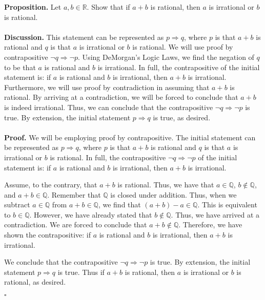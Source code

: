 \documentclass[12pt]{exam}
\begin{document}
\begin{questions}
\question
\textbf{Proposition.}  Let $a,b \in \mathbb R$.  Show that if $a+b$ is rational, then $a$ is irrational or $b$ is rational.
\\
\\\textbf{Discussion.} This statement can be represented as $p \Rightarrow q$, where $p$ is that $a+b$ is rational and $q$ is that $a$ is irrational or $b$ is rational. We will use proof by contrapositive $\neg q \Rightarrow \neg p$. Using DeMorgan's Logic Laws, we find the negation of $q$ to be that $a$ is rational and $b$ is irrational. In full, the contrapositive of the initial statement is: if $a$ is rational and $b$ is irrational, then $a+b$ is irrational. Furthermore, we will use proof by contradiction in assuming that $a+b$ is rational. By arriving at a contradiction, we will be forced to conclude that $a+b$ is indeed irrational. Thus, we can conclude that the contrapositive $\neg q \Rightarrow \neg p$ is true. By extension, the initial statement $p \Rightarrow q$ is true, as desired.
\\
\\\textbf{Proof.} We will be employing proof by contrapositive. The initial statement can be represented as $p \Rightarrow q$, where $p$ is that $a+b$ is rational and $q$ is that $a$ is irrational or $b$ is rational. In full, the contrapositive $\neg q \Rightarrow \neg p$ of the initial statement is: if $a$ is rational and $b$ is irrational, then $a+b$ is irrational. 
\par
Assume, to the contrary, that $a+b$ is rational. Thus, we have that $a \in \mathbb{Q}$, $b \notin \mathbb{Q}$, and $a+b \in \mathbb{Q}$. Remember that $\mathbb{Q}$ is closed under addition. Thus, when we subtract $a \in \mathbb{Q}$ from $a+b \in \mathbb{Q}$, we find that $(a+b)-a \in \mathbb{Q}$. This is equivalent to $b \in \mathbb{Q}$. However, we have already stated that  $b \notin \mathbb{Q}$. Thus, we have arrived at a contradiction. We are forced to conclude that $a+b \notin \mathbb{Q}$. Therefore, we have shown the contrapositive: if $a$ is rational and $b$ is irrational, then $a+b$ is irrational.
\par
We conclude that the contrapositive $\neg q \Rightarrow \neg p$ is true. By extension, the initial statement $p \Rightarrow q$ is true. Thus if $a+b$ is rational, then $a$ is irrational or $b$ is rational, as desired. 
\begin{flushright}
$\square$
\end{flushright}



\end{questions}
\end{document}
